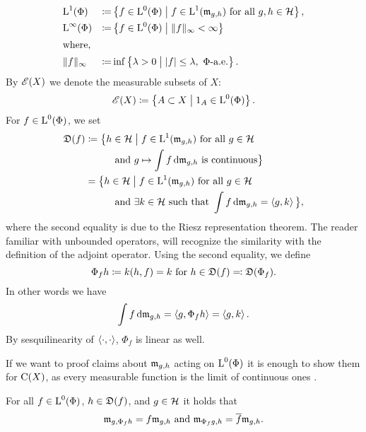 \begin{defi}
 \begin{alignat*}{2}
   &{\text{L}^1}(\Phi) &\coloneqq& \left\lbrace f \in {\text{L}^0}(\Phi) \bigm | f \in \text{L}^1 (\mathfrak{m}_{g,h}) 
   \text{ for all }g,h \in \mathcal{H} \right\rbrace, \\
   &{\text{L}^\infty}(\Phi) &\coloneqq& \left\lbrace f \in {\text{L}^0}(\Phi) \bigm |  \|f \| _\infty 
   < \infty \right\rbrace\\
   \shortintertext{where, }
  &\| f \| _\infty &\coloneqq&  \inf \left\lbrace \lambda > 0 \bigm |
    |f| \leq \lambda,  ~\Phi\text{-a.e.}\right\rbrace.
 \end{alignat*}
  By $\mathscr{E}(X)$ we denote the measurable subsets of $X$:
 \[
 \mathscr{E}(X) \coloneqq \left\lbrace A \subset X \bigm | 1_A \in {\text{L}^0}(\Phi) \right\rbrace.
 \]
 For $f \in {\text{L}^0}(\Phi)$, we set
 \begin{align*}
 \mathfrak{D}(f) &\coloneqq \big\lbrace h \in \mathcal{H} \bigm | f \in \text{L}^1  (\mathfrak{m}_{g,h})
 \text{ for all } g
 \in \mathcal{H}\\
 &~~~~~~~~\text{ and } g \mapsto \int f \operatorname{d}\! \mathfrak{m}_{g, h} \text{ is continuous} 
 \big\rbrace\\
 &=  \big\lbrace h \in \mathcal{H} \bigm | f \in \text{L}^1 (\mathfrak{m}_{g,h}) \text{ for all } g \in
 \mathcal{H} \\
 &~~~~~~~~\text{ and } \exists k \in \mathcal{H} \text{ such that } \int f \operatorname{d}\! \mathfrak{m}_{g,h}
 = \left\langle g, k \right\rangle \big\rbrace,
 \end{align*}
where the second equality is due to the Riesz representation theorem. The 
reader familiar with unbounded operators, will recognize the similarity
with the definition of the adjoint operator.
Using the second equality, we define 
\[
\Phi_f h \coloneqq k(h, f) = k \text{ for } h \in \mathfrak{D}(f) \eqqcolon
\mathfrak{D}(\Phi_f).
\]
In other words we have 
\[
\int f \operatorname{d}\! \mathfrak{m}_{g,h} = \left\langle g, \Phi_f h \right\rangle = \left\langle g, k \right\rangle.
\]
By sesquilinearity of $\left\langle \cdot, \cdot \right\rangle$, $\Phi_f$ is linear as well.
\end{defi}


\begin{rem}

  If we want to proof claims about $\mathfrak{m}_{g,h}$ acting on ${\text{L}^0}(\Phi)$ it
  is enough to show them for 
$\operatorname{C}(X)$, as every measurable function is the limit of continuous ones 
\cite[Proposition 6.2.9]{PedAnaN}.
 
\end{rem}

\begin{lem} \label{lemlinm}
 
  For all $f \in {\text{L}^0}(\Phi)$, $h \in \mathfrak{D}(f)$, and $g\in \mathcal{H}$ it holds that
 \[
 \mathfrak{m}_{g, \Phi_f h} = f\mathfrak{m}_{g,h} \text{ and } \mathfrak{m}_{\Phi_f g, h} = \overline{f}\mathfrak{m}_{g,h}.
 \]

\end{lem}

